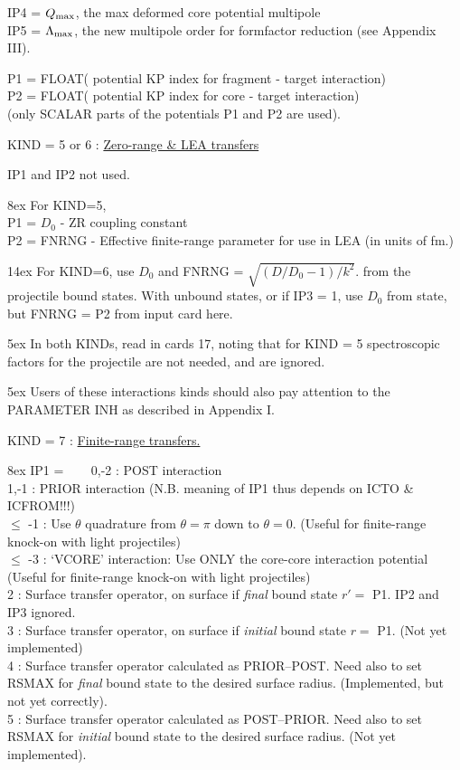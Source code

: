 \documentclass[11pt]{article}
\begin{document}
IP4 = $Q_{\rm max}$, the max deformed core potential multipole\\
IP5 = $\Lambda_{\rm max}$, the new multipole order for formfactor reduction
(see Appendix III).

 P1  = FLOAT( potential KP index for fragment - target interaction) \\
 P2  = FLOAT( potential KP index for core     - target interaction) \\
        (only SCALAR parts of the potentials P1 and P2 are used).
\bigskip

KIND = 5 or 6 :
\underline{Zero-range \& LEA transfers}

IP1 and IP2 not used.

\hangindent 8ex  For KIND=5,
\\  P1 = $D_0$    - ZR coupling constant
\\  P2 = FNRNG - Effective finite-range parameter for use
in LEA (in units of fm.)



\hangindent 14ex
For KIND=6, use $D_0$ and FNRNG = $\sqrt{(D/D_0 - 1)/k^2}$. from the projectile
bound states.  With unbound states, or if IP3 = 1,
use $D_0$ from state, but FNRNG = P2
from input card here.

\hangindent 5ex
 In both KINDs, read in cards 17, noting that for KIND = 5
spectroscopic factors for the projectile are not needed, and are ignored.

\hangindent 5ex
Users of these interactions kinds should also pay attention to the
PARAMETER INH as described in Appendix I.
\bigskip

KIND = 7 :
\underline{Finite-range transfers.}


\hangindent 8ex  IP1 =
~~~  0,-2 : POST interaction
\\  1,-1 : PRIOR interaction
 (N.B. meaning of IP1 thus depends on ICTO \& ICFROM!!!)
\\  $\le$ -1 : Use $\theta$ quadrature from $\theta = \pi$ down to $\theta = 0$.
 (Useful for finite-range knock-on with light projectiles)
\\  $\le$ -3 : `VCORE' interaction:
Use ONLY the core-core interaction potential
 (Useful for finite-range knock-on with light projectiles)
\\ 2 : Surface transfer operator, on surface if {\em final} bound state $r' =$ P1. IP2 and IP3 ignored.
\\ 3 : Surface transfer operator, on surface if {\em initial} bound state $r =$ P1. (Not yet implemented)
\\ 4 : Surface transfer operator calculated as PRIOR--POST. Need also to set RSMAX for {\em final} bound state to the desired surface radius. 
   (Implemented, but not yet correctly).
\\ 5 : Surface transfer operator calculated as POST--PRIOR. Need also to set RSMAX for {\em initial} bound state to the desired surface radius. 
   (Not yet implemented).
\end{document}
